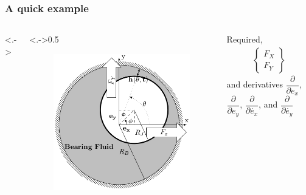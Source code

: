 \documentclass[12pt,usenames,pdftex]{beamer}
\newcommand{\pdderiv}[2][]{\ensuremath{\dfrac{\partial #1}{\partial
      #2}}}
\begin{document}
\begin{frame}
  \frametitle{A quick example}
  \begin{columns}<.->
    \begin{column}<.->{0.5\textwidth}
      \begin{figure}
        \centering
        \includegraphics[width=\linewidth]{Figs/JB}
      \end{figure}
    \end{column}
    \begin{column}{0.5\textwidth}
      Required,
      \begin{eqnarray*}
        \begin{Bmatrix}F_X\\F_Y\end{Bmatrix}
      \end{eqnarray*}
      and derivatives $\pdderiv{e_x}$, $\pdderiv{e_y}$,
      $\pdderiv{\dot{e_x}}$, and $\pdderiv{\dot{e_y}}$
    \end{column}
  \end{columns}


\end{frame}
\end{document}
